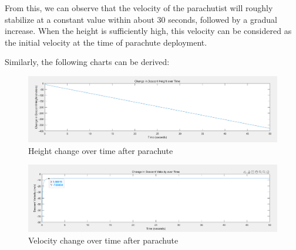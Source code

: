 \documentclass[12pt]{article}
\begin{document}
From this, we can observe that the velocity of the parachutist will roughly stabilize at 
a constant value within about 30 seconds, followed by a gradual increase. When the height is sufficiently high, 
this velocity can be considered as the initial velocity at the time of parachute deployment.

Similarly, the following charts can be derived:
\begin{figure}[!hbtp]
    \centering
    \includegraphics[width = 0.7\linewidth]{image/003.png}
    \caption{Height change over time after parachute}
\end{figure}
\begin{figure}[!hbtp]
    \centering
    \includegraphics[width = 0.7\linewidth]{image/004.png}
    \caption{Velocity change over time after parachute}
\end{figure}
\end{document}
